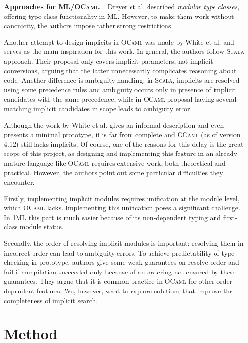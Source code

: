 \documentclass{spbau-diploma}
\begin{document}
\textbf{Approaches for \textsc{ML}/\textsc{OCaml}}.~~Dreyer et al. \cite{ml_typeclasses} described \textit{modular type classes}, offering type class functionality in \textsc{ML}. However, to make them work without canonicity, the authors impose rather strong restrictions. 

Another attempt to design implicits in \textsc{OCaml} was made by White et al. \cite{white} and serves as the main inspiration for this work. In general, the authors follow \textsc{Scala} approach. Their proposal only covers implicit parameters, not implicit conversions, arguing that the latter unnecessarily complicates reasoning about code. Another difference is ambiguity handling: in \textsc{Scala}, implicits are resolved using some precedence rules and ambiguity occurs only in presence of implicit candidates with the same precedence, while in \textsc{OCaml} proposal having several matching implicit candidates in scope leads to ambiguity error.

Although the work by White et al. gives an informal description and even presents a minimal prototype, it is far from complete and \textsc{OCaml} (as of version 4.12) still lacks implicits. Of course, one of the reasons for this delay is the great scope of this project, as designing and implementing this feature in an already mature language like \textsc{OCaml} requires extensive work, both theoretical and practical. However, the authors point out some particular difficulties they encounter.

Firstly, implementing implicit modules requires unification at the module level, which \textsc{OCaml} lacks. Implementing this unification poses a significant challenge. In \textsc{1ML} this part is much easier because of its non-dependent typing and first-class module status. 

Secondly, the order of resolving implicit modules is important: resolving them in incorrect order can lead to ambiguity errors. To achieve predictability of type checking in prototype, authors give some weak guarantees on resolve order and fail if compilation succeeded only because of an ordering not ensured by these guarantees. They argue that it is common practice in \textsc{OCaml} for other order-dependent features. We, however, want to explore solutions that improve the completeness of implicit search.

\section{Method}
\end{document}
